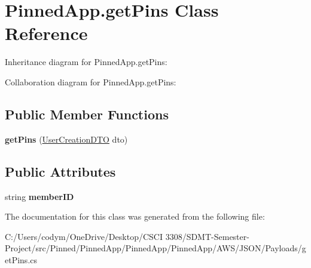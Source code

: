 \hypertarget{class_pinned_app_1_1get_pins}{}\section{Pinned\+App.\+get\+Pins Class Reference}
\label{class_pinned_app_1_1get_pins}


Inheritance diagram for Pinned\+App.\+get\+Pins\+:


Collaboration diagram for Pinned\+App.\+get\+Pins\+:
\subsection*{Public Member Functions}
\begin{DoxyCompactItemize}
\item 
\mbox{\label{class_pinned_app_1_1get_pins_a1edff185fe57bcf6b263a5e3d6623c7d}} 
{\bfseries get\+Pins} (\hyperlink{class_pinned_app_1_1_user_creation_d_t_o}{User\+Creation\+D\+TO} dto)
\end{DoxyCompactItemize}
\subsection*{Public Attributes}
\begin{DoxyCompactItemize}
\item 
\mbox{\label{class_pinned_app_1_1get_pins_ad25f1afeb9226006110e94a8fe3c050f}} 
string {\bfseries member\+ID}
\end{DoxyCompactItemize}


The documentation for this class was generated from the following file\+:\begin{DoxyCompactItemize}
\item 
C\+:/\+Users/codym/\+One\+Drive/\+Desktop/\+C\+S\+C\+I 3308/\+S\+D\+M\+T-\/\+Semester-\/\+Project/src/\+Pinned/\+Pinned\+App/\+Pinned\+App/\+Pinned\+App/\+A\+W\+S/\+J\+S\+O\+N/\+Payloads/get\+Pins.\+cs\end{DoxyCompactItemize}
